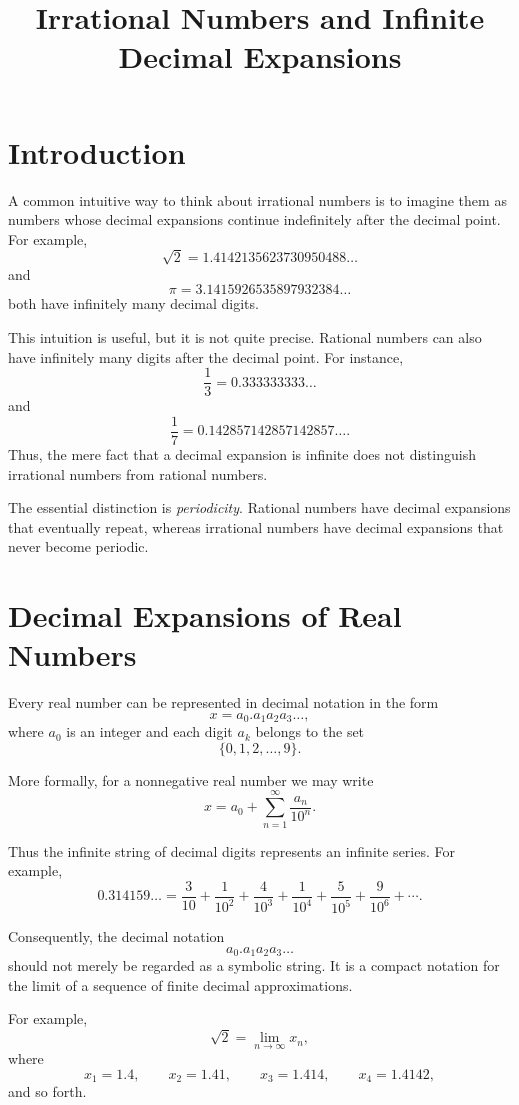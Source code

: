 \documentclass{essay}
\title{Irrational Numbers and Infinite Decimal Expansions}
\author{}
\date{}
\begin{document}
\maketitle

\section{Introduction}

A common intuitive way to think about irrational numbers is to imagine them as numbers whose decimal expansions continue indefinitely after the decimal point. For example,
\[
\sqrt{2}
=
1.4142135623730950488\ldots
\]
and
\[
\pi
=
3.1415926535897932384\ldots
\]
both have infinitely many decimal digits.

This intuition is useful, but it is not quite precise. Rational numbers can also have infinitely many digits after the decimal point. For instance,
\[
\frac{1}{3}
=
0.333333333\ldots
\]
and
\[
\frac{1}{7}
=
0.142857142857142857\ldots.
\]
Thus, the mere fact that a decimal expansion is infinite does not distinguish irrational numbers from rational numbers.

The essential distinction is \emph{periodicity}. Rational numbers have decimal expansions that eventually repeat, whereas irrational numbers have decimal expansions that never become periodic.

\section{Decimal Expansions of Real Numbers}

Every real number can be represented in decimal notation in the form
\[
x
=
a_0.a_1a_2a_3\ldots,
\]
where \(a_0\) is an integer and each digit \(a_k\) belongs to the set
\[
\{0,1,2,\ldots,9\}.
\]

More formally, for a nonnegative real number we may write
\[
x
=
a_0
+
\sum_{n=1}^{\infty}\frac{a_n}{10^n}.
\]

Thus the infinite string of decimal digits represents an infinite series. For example,
\[
0.314159\ldots
=
\frac{3}{10}
+
\frac{1}{10^2}
+
\frac{4}{10^3}
+
\frac{1}{10^4}
+
\frac{5}{10^5}
+
\frac{9}{10^6}
+\cdots.
\]

Consequently, the decimal notation
\[
a_0.a_1a_2a_3\ldots
\]
should not merely be regarded as a symbolic string. It is a compact notation for the limit of a sequence of finite decimal approximations.

For example,
\[
\sqrt{2}
=
\lim_{n\to\infty} x_n,
\]
where
\[
x_1=1.4,\qquad
x_2=1.41,\qquad
x_3=1.414,\qquad
x_4=1.4142,
\]
and so forth.
\end{document}
